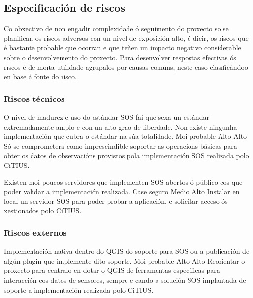 \subsection{Especificación de riscos}
Co obxectivo de non engadir complexidade ó seguimento do proxecto so se planifican os riscos adversos con un nivel de exposición alto, é dicir, os riscos que é bastante probable que ocorran e que teñen un impacto negativo considerable sobre o desenvolvemento do proxecto. Para desenvolver respostas efectivas ós riscos é de moita utilidade agrupalos por causas comúns, neste caso clasificándoo en base á fonte do risco.

\subsubsection{Riscos técnicos}
		  	{O nivel de madurez e uso do estándar SOS fai que sexa un estándar extremadamente amplo e con un alto grao de liberdade. Non existe ningunha implementación que cubra o estándar na súa totalidade.}
			{Moi probable} %
			{Alto} %
			{Alto} %
			{Só se comprometerá como imprescindible soportar as operacións básicas para obter os datos de observacións provistos pola implementación SOS realizada polo CiTIUS.}

		  	{Existen moi poucos servidores que implementen SOS abertos ó público cos que poder validar a implementación realizada.}
			{Case seguro} %
			{Medio} %
			{Alto} %
			{Instalar en local un servidor SOS para poder probar a aplicación, e solicitar acceso ós xestionados polo CiTIUS.}
			
\subsubsection{Riscos externos}
		  	{Implementación nativa dentro do QGIS do soporte para SOS ou a publicación de algún plugin que implemente dito soporte.}
			{Moi probable} %
			{Alto} %
			{Alto} %
			{Reorientar o proxecto para centralo en dotar o QGIS de ferramentas específicas para interacción cos datos de sensores, sempre e cando a solución SOS implantada de soporte a implementación realizada polo CiTIUS.}

